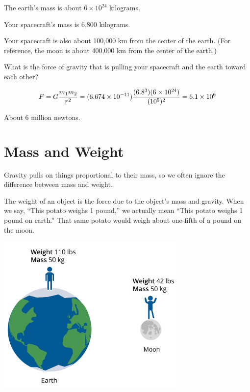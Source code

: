 \begin{Exercise}[title={Gravity}, label=gravity_earth]

  The earth's mass is about $6 \times 10^{24}$ kilograms.

  Your spacecraft's mass is 6,800 kilograms.

  Your spacecraft is also about 100,000 km from the center of the earth. (For reference, the moon is about 400,000 km from the center of the earth.)

  What is the force of gravity that is pulling your spacecraft and the earth toward each other?

\end{Exercise}
\begin{Answer}[ref=gravity_earth]

  $$F = G\frac{m_1 m_2}{r^2} = (6.674 \times 10^{-11})\frac{(6.8 \time 10^3)(6 \times 10^{24})}{(10^5)^2} = 6.1 \times 10^{6}$$

  About 6 million newtons.

\end{Answer}

\section{Mass and Weight}

Gravity pulls on things proportional to their mass, so we often
ignore the difference between mass and weight.

The weight of an object is the force due to the object's mass and
gravity.  When we say, ``This potato weighs 1 pound,'' we actually mean
``This potato weighs 1 pound on earth.''  That same potato would weigh
about one-fifth of a pound on the moon.

\includegraphics[width=0.7\textwidth]{massvweight.png}

